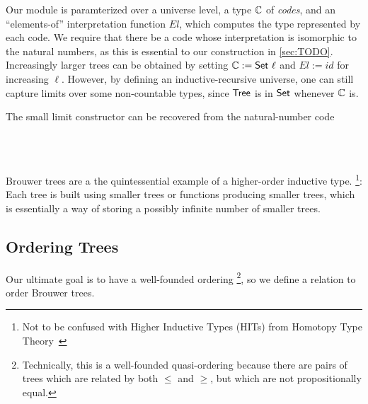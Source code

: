 Our module is paramterized over a universe level, a type ${\mathbb{C}}$ of \textit{codes}, and an ``elements-of'' interpretation
function $\mathit{El}$, which computes the type represented by each code.
We require that there be a code whose interpretation is isomorphic to the natural numbers,
as this is essential to our construction in \cref{sec:TODO}.
Increasingly larger trees can be obtained by setting $\bC := \AgdaPrimitive{Set} \ \ell$ and
$\mathit{El} := \mathit{id}$ for increasing $\ell$.
However, by defining an inductive-recursive universe,
one can still capture limits over some non-countable types, since
 $\AgdaDatatype{Tree}$ is in $\AgdaPrimitive{Set}$ whenever ${\mathbb{C}}$ is.

The small limit constructor can be recovered from the natural-number code
\begin{code}%
\>[0]\<%
\\
\>[0][@{}l@{\AgdaIndent{1}}]%
\>[4]\AgdaSpace{}%
\AgdaSymbol{:}\AgdaSpace{}%
\AgdaSymbol{(}\AgdaSpace{}%
\AgdaSpace{}%
\AgdaSymbol{)}\AgdaSpace{}%
\AgdaSpace{}%
\<%
\\
%
\>[4]\AgdaSpace{}%
\AgdaSpace{}%
\AgdaSymbol{=}\AgdaSpace{}%
\AgdaSpace{}%
%
\>[21]\AgdaSpace{}%
\AgdaSpace{}%
\AgdaSpace{}%
\AgdaSpace{}%
\AgdaSymbol{(}\AgdaSpace{}%
\AgdaSpace{}%
\AgdaSymbol{))}\<%
\end{code}

Brouwer trees are a the quintessential example of a higher-order inductive type.%
\footnote{Not to be confused with Higher Inductive Types (HITs) from Homotopy Type Theory~\citep{hottbook}}:
Each tree is built using smaller trees or functions producing smaller trees, which is essentially
a way of storing a possibly infinite number of smaller trees.

\subsection{Ordering Trees}

Our ultimate goal is to have a well-founded ordering%
\footnote{Technically, this is a well-founded quasi-ordering because there are pairs of
  trees which are related by both $\leq$ and $\geq$, but which are not propositionally equal.},
so we define a relation to order Brouwer trees.

